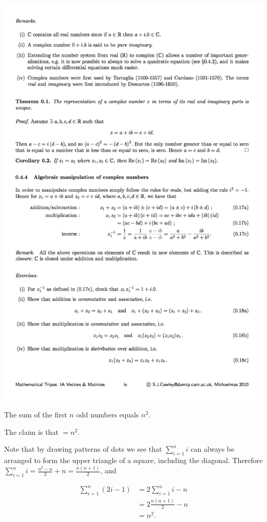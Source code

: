 \begin{mdframed}
  \includegraphics[width=400pt]{img/misc--cambridge-1a-vectors-and-matrices-revision-3.png}
\end{mdframed}


\begin{claim*}
  The sum of the first $n$ odd numbers equals $n^2$.
\end{claim*}

The claim is that $ = n^2$.

Note that by drawing patterns of dots we see that $\sum_{i=1}^n i$ can always be arranged to form
the upper triangle of a square, including the diagonal. Therefore
$\sum_{i=1}^n i = \frac{n^2 - n}{2} + n = \frac{n(n+1)}{2}$, and

\begin{align*}
  \sum_{i=1}^n (2i - 1)
  &= 2\sum_{i=1}^n i - n \\
  &= 2\frac{n(n+1)}{2} - n \\
  &= n^2.
\end{align*}
